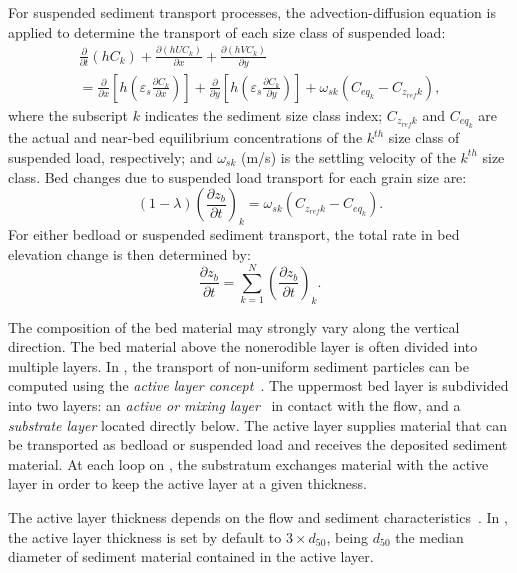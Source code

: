 For suspended sediment transport processes, the advection-diffusion equation is applied to determine the transport of each size class of suspended load:
\begin{multline}
\frac{\partial}{\partial t}\left(hC_k\right)+\frac{\partial (hUC_k)}{\partial x} + \frac{\partial (hVC_k)}{\partial y} \\
=\frac{\partial}{\partial x}\left[h\left(\varepsilon_s\frac{\partial C_k}{\partial x}\right)\right]+
\frac{\partial}{\partial y}\left[h\left(\varepsilon_s\frac{\partial C_k}{\partial y}\right)\right]+
\omega_{sk}\left(C_{eq_k}-C_{z_{ref}k}\right),
\end{multline}
where the subscript $k$ indicates the sediment size class index; $C_{z_{ref}k}$ and $C_{eq_k}$ are the actual and near-bed equilibrium concentrations of the $k^{th}$ size class of suspended load, respectively; and $\omega_{sk}$ (m/s) is the settling velocity of the $k^{th}$ size class.
\noindent
Bed changes due to suspended load transport for each grain size are:
\begin{equation}
(1-\lambda)\left(\frac{\partial z_b}{\partial t}\right)_k = \omega_{sk}\left(C_{z_{ref}k}-C_{eq_k}\right).
\end{equation}
\noindent
For either bedload or suspended sediment transport, the total rate in bed elevation change is then determined by:
\begin{equation}
\frac{\partial z_b}{\partial t} = \sum_{k=1}^N\left(\frac{\partial z_b}{\partial t}\right)_k.
\end{equation}
\noindent

The composition of the bed material may strongly vary along the vertical direction. The bed material above the nonerodible layer is often divided into multiple layers. In \sisyphe{}, the transport of non-uniform sediment particles can be computed using the \emph{active layer concept}~\cite{ElKadiAbderrezzak201675}. The uppermost bed layer is subdivided into two layers: an \textit{active or mixing layer}~\cite{Hirano1971} in contact with the flow, and a \textit{substrate layer} located directly below. The active layer supplies material that can be transported as bedload or suspended load and receives the deposited sediment material. At each loop on \sisyphe{}, the substratum exchanges material with the active layer in order to keep the active layer at a given thickness.

The active layer thickness depends on the flow and sediment characteristics~\cite{vanRijn87}. In \sisyphe{}, the active layer thickness is set by default to $3\times d_{50}$, being $d_{50}$ the median diameter of sediment material contained in the active layer.

